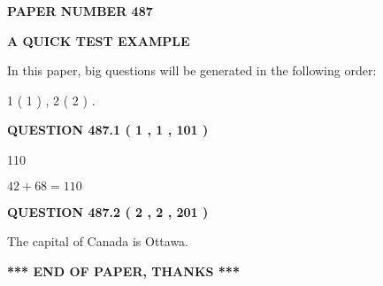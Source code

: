 \documentclass[12pt]{article}
\begin{document}
   
   
   
 {\textbf{ \Large{ PAPER NUMBER  487  }}}
   
   
\vspace{0.2in}
   
   
   
   
   
   
 \vspace{0.2in}
{\LARGE {\textbf{ A QUICK TEST EXAMPLE}}}
   
   
   
\vspace{0.2in}
   
In this paper, big questions will be generated in the following order: 
   
   
   1 ( 1 )
 ,
   2 ( 2 )
 .
  
\vspace{0.2in}
  
{\textbf{\Large{QUESTION
487.1 
 ( 1 , 1 , 101 )
}}}
  
  
 
 
\noindent{}

110
 
 
 
 
\noindent{}

$ %
42 +  %
68=   %
110$
 
 
  
\vspace{0.2in}
  
{\textbf{\Large{QUESTION
487.2 
 ( 2 , 2 , 201 )
}}}
  
  
 
 
\noindent{}
 
 
The capital of Canada is Ottawa.
 
 
 
 
   
   
 \vspace{0.2in}
 
   
   
   
   
\vspace{1.0in} 
{\textbf{\large{ *** END OF PAPER, THANKS *** }}} 
   
\end{document}
